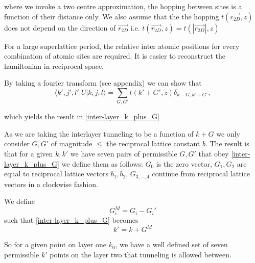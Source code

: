 \documentclass[10pt, twocolumn]{article} %
\begin{document}
  where we invoke a two centre approximation, the hopping between sites is a function of their distance only. We also assume that the the hopping $t(\vec{r_{2D}}, z)$ does not depend on the direction of $\vec{r_{2D}}$ i.e. $t(\vec{r_{2D}}, z) = t(|\vec{r_{2D}}|, z)$

  For a large superlattice period, the relative inter atomic positions for every combination of atomic sites are required. It is easier to reconstruct the hamiltonian in reciprocal space.

  By taking a fourier transform (see appendix) we can show that
  \begin{equation}
    \langle k',j',l' | U | k, j, l \rangle = \sum_{G, G'} t(k'+G', z) \delta_{k-G, k'+G'},
    \label{inter-layer_hopping_elements}
  \end{equation}
  
  which yields the result in \ref{inter-layer_k_plus_G}
  
  As we are taking the interlayer tunneling to be a function of $k+G$ we only consider $G, G'$ of magnitude $\leq$ the reciprocal lattice constant $b$. The result is that for a given $k, k'$ we have seven pairs of permissible $G, G'$ that obey \ref{inter-layer_k_plus_G} we define them as follows: $G_0$ is the zero vector, $G_1, G_2$ are equal to reciprocal lattice vectors $b_1, b_2$, $G_{3,\cdots,4}$ continue from reciprocal lattice vectors in a clockwise fashion.

  We define
  \begin{equation}
    G_i^M = G_i - G_i'
    \label{inter-layer_G_M_def}
  \end{equation}
  such that \ref{inter-layer_k_plus_G} becomes
  \begin{equation}
    k' = k + G^M
    \label{inter-layer_k_plus_G_M}
  \end{equation}

  So for a given point on layer one $k_0$, we have a well defined set of seven permissible $k'$ points on the layer two that tunneling is allowed between.
\end{document}
